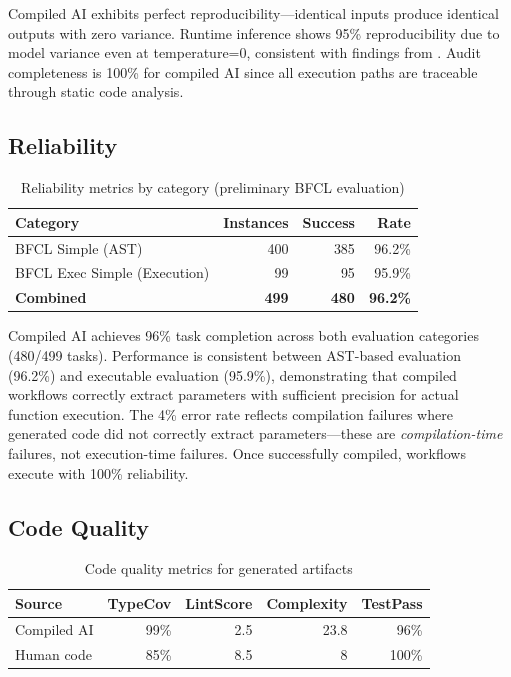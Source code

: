 \documentclass[11pt]{article}
\begin{document}
Compiled AI exhibits perfect reproducibility---identical inputs produce identical outputs with zero variance. Runtime inference shows 95\% reproducibility due to model variance even at temperature=0, consistent with findings from \citet{atil2024nondeterminism}. Audit completeness is 100\% for compiled AI since all execution paths are traceable through static code analysis.

\subsection{Reliability}

\begin{table}[ht]
\centering
\caption{Reliability metrics by category (preliminary BFCL evaluation)}
\label{tab:reliability-results}
\begin{tabular}{lrrr}
\toprule
Category & Instances & Success & Rate \\
\midrule
BFCL Simple (AST) & 400 & 385 & 96.2\% \\
BFCL Exec Simple (Execution) & 99 & 95 & 95.9\% \\
\midrule
\textbf{Combined} & \textbf{499} & \textbf{480} & \textbf{96.2\%} \\
\bottomrule
\end{tabular}
\end{table}

Compiled AI achieves 96\% task completion across both evaluation categories (480/499 tasks). Performance is consistent between AST-based evaluation (96.2\%) and executable evaluation (95.9\%), demonstrating that compiled workflows correctly extract parameters with sufficient precision for actual function execution. The 4\% error rate reflects compilation failures where generated code did not correctly extract parameters---these are \textit{compilation-time} failures, not execution-time failures. Once successfully compiled, workflows execute with 100\% reliability.

\subsection{Code Quality}

\begin{table}[ht]
\centering
\caption{Code quality metrics for generated artifacts}
\label{tab:quality-results}
\begin{tabular}{lrrrr}
\toprule
Source & TypeCov & LintScore & Complexity & TestPass \\
\midrule
Compiled AI & 99\% & 2.5 & 23.8 & 96\% \\
Human code & 85\% & 8.5 & 8 & 100\% \\
\bottomrule
\end{tabular}
\end{table}
\end{document}
